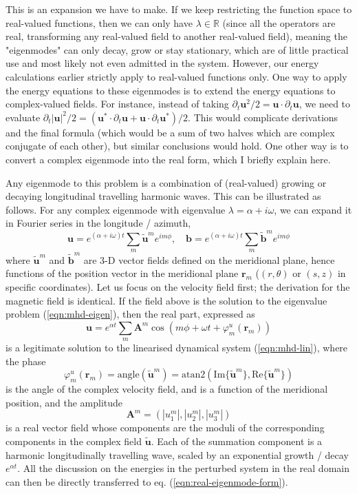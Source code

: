 This is an expansion we have to make. If we keep restricting the function space to real-valued functions, then we can only have $\lambda \in \mathbb{R}$ (since all the operators are real, transforming any real-valued field to another real-valued field), meaning the "eigenmodes" can only decay, grow or stay stationary, which are of little practical use and most likely not even admitted in the system. However, our energy calculations earlier strictly apply to real-valued functions only. 
One way to apply the energy equations to these eigenmodes is to extend the energy equations to complex-valued fields. For instance, instead of taking $\partial_t \mathbf{u}^2/2 = \mathbf{u}\cdot \partial_t \mathbf{u}$, we need to evaluate $\partial_t |\mathbf{u}|^2/2 = (\mathbf{u}^*\cdot \partial_t \mathbf{u} + \mathbf{u}\cdot \partial_t \mathbf{u}^*)/2$. This would complicate derivations and the final formula (which would be a sum of two halves which are complex conjugate of each other), but similar conclusions would hold. One other way is to convert a complex eigenmode into the real form, which I briefly explain here.

Any eigenmode to this problem is a combination of (real-valued) growing or decaying longitudinal travelling harmonic waves. This can be illustrated as follows. For any complex eigenmode with eigenvalue $\lambda = \alpha + i\omega$, we can expand it in Fourier series in the longitude / azimuth,
%
\[
    \mathbf{u} = e^{(\alpha + i\omega) t} \sum_m \tilde{\mathbf{u}}^m e^{im\phi},\quad 
    \mathbf{b} = e^{(\alpha + i\omega) t} \sum_m \tilde{\mathbf{b}}^m e^{im\phi}
\]
%
where $\tilde{\mathbf{u}}^m$ and $\tilde{\mathbf{b}}^m$ are 3-D vector fields defined on the meridional plane, hence functions of the position vector in the meridional plane $\mathbf{r}_m$ ($(r, \theta)$ or $(s, z)$ in specific coordinates). Let us focus on the velocity field first; the derivation for the magnetic field is identical. If the field above is the solution to the eigenvalue problem (\ref{eqn:mhd-eigen}), then the real part, expressed as
%
\begin{equation}\label{eqn:real-eigenmode-form}
    \mathbf{u} = e^{\alpha t} \sum_m \mathbf{A}^m \cos(m\phi + \omega t + \varphi_m^u(\mathbf{r}_m))
\end{equation}
%
is a legitimate solution to the linearised dynamical system (\ref{eqn:mhd-lin}), where the phase
%
\[
    \varphi_m^u (\mathbf{r}_m) = \mathrm{angle} (\tilde{\mathbf{u}}^m) = \mathrm{atan2}\left(\mathrm{Im}\{\tilde{\mathbf{u}}^m\}, \mathrm{Re}\{\tilde{\mathbf{u}}^m\}\right)
\]
%
is the angle of the complex velocity field, and is a function of the meridional position, and the amplitude
%
\[
    \mathbf{A}^m = \left(|u_1^m|, |u_2^m|, |u_3^m|\right)
\]
%
is a real vector field whose components are the moduli of the corresponding components in the complex field $\tilde{\mathbf{u}}$.
Each of the summation component is a harmonic longitudinally travelling wave, scaled by an exponential growth / decay $e^{\alpha t}$. All the discussion on the energies in the perturbed system in the real domain can then be directly transferred to eq. (\ref{eqn:real-eigenmode-form}).

